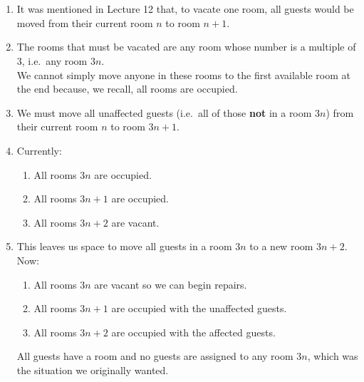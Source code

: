 \documentclass{article}
\begin{document}
\section{}
\begin{enumerate}
    \item It was mentioned in Lecture 12 that, to vacate one room, all guests would be moved from their current room $n$ to room $n+1$.
    \item The rooms that must be vacated are any room whose number is a multiple of 3, i.e.\ any room $3n$. \\
    We cannot simply move anyone in these rooms to the first available room at the end because, we recall, all rooms are occupied.
    \item We must move all unaffected guests (i.e.\ all of those \textbf{not} in a room $3n$) from their current room $n$ to room $3n+1$. 
    \item Currently:
    \begin{enumerate}
        \item All rooms $3n$ are occupied.
        \item All rooms $3n+1$ are occupied.
        \item All rooms $3n+2$ are vacant.
    \end{enumerate}
    \item This leaves us space to move all guests in a room $3n$ to a new room $3n+2$. Now:
    \begin{enumerate}
        \item All rooms $3n$ are vacant so we can begin repairs.
        \item All rooms $3n+1$ are occupied with the unaffected guests.
        \item All rooms $3n+2$ are occupied with the affected guests.
    \end{enumerate}
    All guests have a room and no guests are assigned to any room $3n$, which was the situation we originally wanted.
\end{enumerate}
\end{document}
